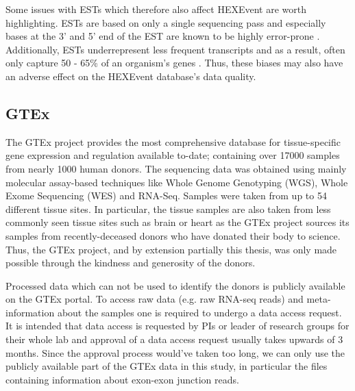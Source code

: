 Some issues with ESTs which therefore also affect HEXEvent are worth highlighting. ESTs are based on only a single sequencing pass and especially bases at the 3' and 5' end of the EST are known to be highly error-prone \cite{hitchhiker}. Additionally, ESTs underrepresent less frequent transcripts and as a result, often only capture 50 - 65\% of an organism's genes \cite{estunderrepresenttransripts}. Thus, these biases may also have an adverse effect on the HEXEvent database's data quality.




\subsection{GTEx} \label{subsec:gtex}
The GTEx project provides the most comprehensive database for tissue-specific gene expression and regulation available to-date; containing over 17000 samples from nearly 1000 human donors. The sequencing data was obtained using mainly molecular assay-based techniques like Whole Genome Genotyping (WGS), Whole Exome Sequencing (WES) and RNA-Seq. Samples were taken from up to 54 different tissue sites. In particular, the tissue samples are also taken from less commonly seen tissue sites such as brain or heart as the GTEx project sources its samples from recently-deceased donors who have donated their body to science. Thus, the GTEx project, and by extension partially this thesis, was only made possible through the kindness and generosity of the donors.

Processed data which can not be used to identify the donors is publicly available on the GTEx portal. To access raw data (e.g. raw RNA-seq reads) and meta-information about the samples one is required to undergo a data access request. It is intended that data access is requested by PIs or leader of research groups for their whole lab and approval of a data access request usually takes upwards of 3 months. 
Since the approval process would've taken too long, we can only use the publicly available part of the GTEx data in this study, in particular the files containing information about exon-exon junction reads. 

